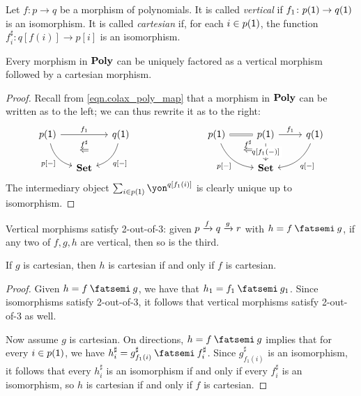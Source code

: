 \documentclass[Book-Poly]{subfiles}
\begin{document}
\begin{definition}
Let $f\colon p\to q$ be a morphism of polynomials.
It is called \emph{vertical} if $f_1\colon p(\textsf{1})\to q(\textsf{1})$ is an isomorphism.
It is called \emph{cartesian} if, for each $i\in p(\textsf{1})$, the function $f^\sharp_i\colon q[f(i)]\to p[i]$ is an isomorphism.
\end{definition}

\begin{proposition}\label{prop.vert_cart_factorization}
Every morphism in $\mathbf{Poly}$ can be uniquely factored as a vertical morphism followed by a cartesian morphism.
\end{proposition}
\begin{proof}
Recall from \eqref{eqn.colax_poly_map} that a morphism in $\mathbf{Poly}$ can be written as to the left; we can thus rewrite it as to the right:
\[
\begin{tikzcd}[column sep=small]
	p(\1)\ar[dr, bend right, "{p[-]}"']\ar[rr, "f_1"]&~&
	q(\1)\ar[dl, bend left, "{q[-]}"]\\&
	\smset\ar[u, phantom, near end, "\overset{f^\sharp}{\Leftarrow}"]
\end{tikzcd}
\hspace{1in}
\begin{tikzcd}
	p(\1)\ar[dr, bend right, "{p[-]}"']\ar[r, equal, ""' name=equal]&
	p(\1)\ar[d, "{q[f_1(-)]}" description]\ar[r, "f_1"]&
	q(\1)\ar[dl, bend left, "{q[-]}"]\\&
	|[alias=set]|\smset\ar[from=equal, to=set, pos=.3, phantom, "\overset{f^\sharp}{\Leftarrow}"]
\end{tikzcd}
\]
The intermediary object $\sum_{i\in p(\1)} \yon^{q[f_1(i)]}$ is clearly unique up to isomorphism.
\end{proof}

\begin{proposition}
Vertical morphisms satisfy 2-out-of-3: given $p\xrightarrow{f}q\xrightarrow{g}r$ with $h = f \then g$, if any two of $f,g,h$ are vertical, then so is the third.

If $g$ is cartesian, then $h$ is cartesian if and only if $f$ is cartesian.
\end{proposition}
\begin{proof}
Given $h = f \then g$, we have that $h_1 = f_1 \then g_1$.
Since isomorphisms satisfy 2-out-of-3, it follows that vertical morphisms satisfy 2-out-of-3 as well.

Now assume $g$ is cartesian.
On directions, $h = f \then g$ implies that for every $i \in p(\textsf{1})$, we have $h^\sharp_i = g^\sharp_{f_1(i)} \then f^\sharp_i$.
Since $g^\sharp_{f_1(i)}$ is an isomorphism, it follows that every $h^\sharp_i$ is an isomorphism if and only if every $f^\sharp_i$ is an isomorphism, so $h$ is cartesian if and only if $f$ is cartesian.
\end{proof}
\end{document}
